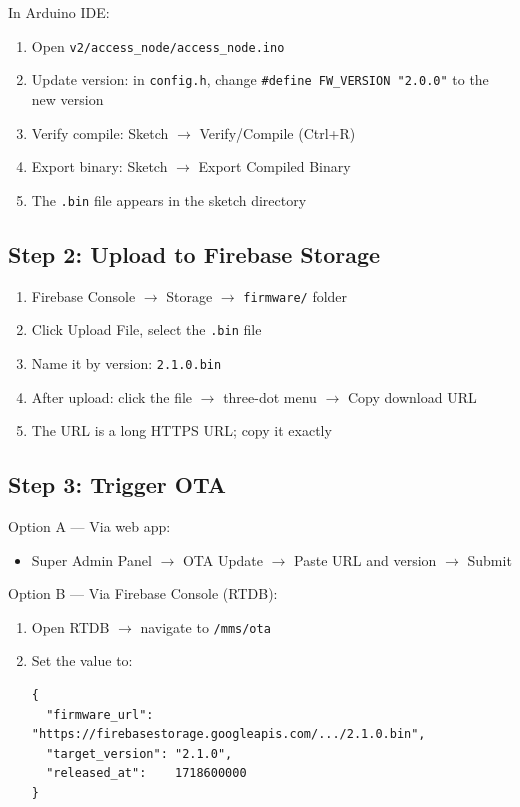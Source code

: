 In Arduino IDE:
\begin{enumerate}[leftmargin=1.5em]
    \item Open \texttt{v2/access\_node/access\_node.ino}
    \item Update version: in \texttt{config.h}, change \texttt{\#define FW\_VERSION "2.0.0"} to the new version
    \item Verify compile: Sketch $\rightarrow$ Verify/Compile (Ctrl+R)
    \item Export binary: Sketch $\rightarrow$ Export Compiled Binary
    \item The \texttt{.bin} file appears in the sketch directory
\end{enumerate}

\subsection{Step 2: Upload to Firebase Storage}

\begin{enumerate}[leftmargin=1.5em]
    \item Firebase Console $\rightarrow$ Storage $\rightarrow$ \texttt{firmware/} folder
    \item Click Upload File, select the \texttt{.bin} file
    \item Name it by version: \texttt{2.1.0.bin}
    \item After upload: click the file $\rightarrow$ three-dot menu $\rightarrow$ Copy download URL
    \item The URL is a long HTTPS URL; copy it exactly
\end{enumerate}

\subsection{Step 3: Trigger OTA}

Option A — Via web app:
\begin{itemize}[leftmargin=1.5em]
    \item Super Admin Panel $\rightarrow$ OTA Update $\rightarrow$ Paste URL and version $\rightarrow$ Submit
\end{itemize}

Option B — Via Firebase Console (RTDB):
\begin{enumerate}[leftmargin=1.5em]
    \item Open RTDB $\rightarrow$ navigate to \texttt{/mms/ota}
    \item Set the value to:
\begin{lstlisting}[style=jsonlstyle]
{
  "firmware_url":   "https://firebasestorage.googleapis.com/.../2.1.0.bin",
  "target_version": "2.1.0",
  "released_at":    1718600000
}
\end{lstlisting}
\end{enumerate}

